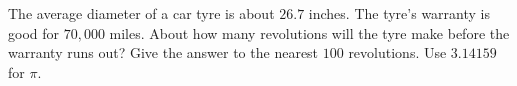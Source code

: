 The average diameter of a car tyre is about $26.7$ inches. The tyre's warranty is good for $70{,}000$ miles. About how many revolutions will the tyre make before the warranty runs out? Give the answer to the nearest $100$ revolutions. Use $3.14159$ for $\pi$.
